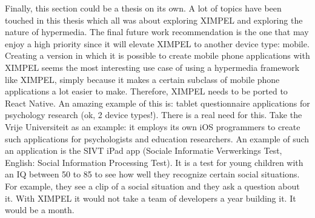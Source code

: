 Finally, this section could be a thesis on its own. A lot of topics have been touched in this thesis which all was about exploring XIMPEL and exploring the nature of hypermedia. The final future work recommendation is the one that may enjoy a high priority since it will elevate XIMPEL to another device type: mobile. Creating a version in which it is possible to create mobile phone applications with XIMPEL seems the most interesting use case of using a hypermedia framework like XIMPEL, simply because it makes a certain subclass of mobile phone applications a lot easier to make. Therefore, XIMPEL needs to be ported to React Native. An amazing example of this is: tablet questionnaire applications for psychology research (ok, 2 device types!). There is a real need for this. Take the Vrije Universiteit as an example: it employs its own iOS programmers to create such applications for psychologists and education researchers. An example of such an application is the SIVT iPad app (Sociale Informatie Verwerkings Test, English: Social Information Processing Test). It is a test for young children with an IQ between 50 to 85 to see how well they recognize certain social situations. For example, they see a clip of a social situation and they ask a question about it. With XIMPEL it would not take a team of developers a year building it. It would be a month.